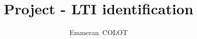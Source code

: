 \documentclass[journal]{IEEEtran}
\begin{document}
\title{Project - LTI identification}

\author{Emmeran~COLOT}

\maketitle







\nocite{*}
\printbibliography
\end{document}
